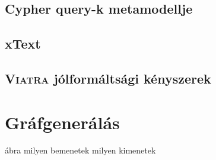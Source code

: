 \subsection{Cypher query-k metamodellje}
\subsection{xText}
\subsection{\textsc{Viatra} jólformáltsági kényszerek}

\section{Gráfgenerálás}

ábra milyen bemenetek milyen kimenetek





